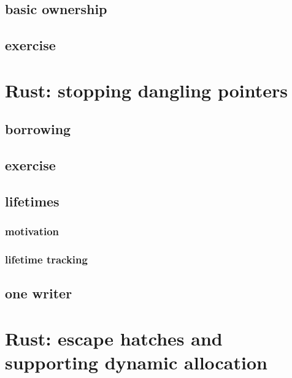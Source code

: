 \subsection{basic ownership}


\subsection{exercise}


\section{Rust: stopping dangling pointers}


\subsection{borrowing}


\subsection{exercise}



\subsection{lifetimes}
\subsubsection{motivation}


\subsubsection{lifetime tracking}


\subsection{one writer}


\section{Rust: escape hatches and supporting dynamic allocation}


